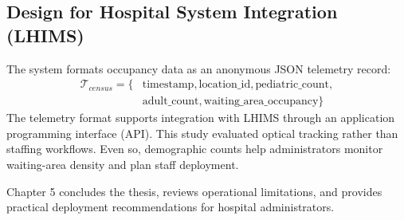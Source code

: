 \subsection{Design for Hospital System Integration (LHIMS)}
The system formats occupancy data as an anonymous JSON telemetry record:
\begin{equation}
    \begin{aligned}
    \mathcal{T}_{census} = \{ & \text{timestamp}, \text{location\_id}, \text{pediatric\_count}, \\
    & \text{adult\_count}, \text{waiting\_area\_occupancy} \}
    \end{aligned}
\end{equation}
The telemetry format supports integration with LHIMS through an application programming interface (API). This study evaluated optical tracking rather than staffing workflows. Even so, demographic counts help administrators monitor waiting-area density and plan staff deployment.

Chapter 5 concludes the thesis, reviews operational limitations, and provides practical deployment recommendations for hospital administrators.
